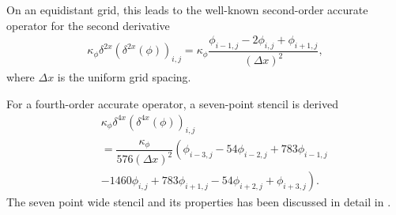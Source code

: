 \documentclass[gmd]{copernicus}
\begin{document}
On an equidistant grid, this leads to the well-known second-order accurate operator for the second derivative
\begin{eqnarray}
\kappa_\phi \delta^{2x} \left( \delta^{2x} \left( \phi \right) \right)_{i,j} =
\kappa_\phi \dfrac{ \phi_{i-1,j} - 2 \phi_{i,j} + \phi_{i+1,j} }{\left( \Delta x \right)^2},
\end{eqnarray}
where $\Delta x$ is the uniform grid spacing.

For a fourth-order accurate operator, a seven-point stencil is derived
\begin{eqnarray}
\nonumber
&& \kappa_\phi \delta^{4x} \left( \delta^{4x} \left( \phi \right) \right)_{i,j}\\
\nonumber
&& = \dfrac{\kappa_\phi}{576 \left( \Delta x \right)^2} \left( \phi_{i-3,j} - 54 \phi_{i-2,j} + 783 \phi_{i-1,j}\right.\\
&&  \left. - 1460  \phi_{i,j} + 783 \phi_{i+1,j} - 54 \phi_{i+2,j} + \phi_{i+3,j} \right).
\end{eqnarray}
The seven point wide stencil and its properties has been discussed in detail in \citet{Castillo1995}.
\end{document}
